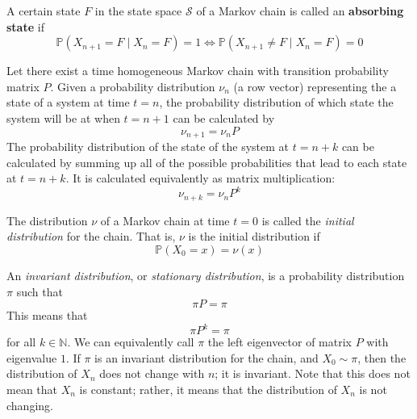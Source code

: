   \begin{definition}
    A certain state $F$ in the state space $\mathcal{S}$ of a Markov chain is called an \textbf{absorbing state} if
    \begin{equation}
      \mathbb{P}(X_{n+1} = F \; | \; X_n = F) = 1 \iff \mathbb{P}(X_{n+1} \neq F \; | \; X_n = F) = 0
    \end{equation}
  \end{definition}

  \begin{theorem}
    Let there exist a time homogeneous Markov chain with transition probability matrix $P$. Given a probability distribution $\nu_n$ (a row vector) representing the a state of a system at time $t=n$, the probability distribution of which state the system will be at when $t=n+1$ can be calculated by 
    \begin{equation}
      \nu_{n+1} = \nu_n P
    \end{equation}
    The probability distribution of the state of the system at $t=n+k$ can be calculated by summing up all of the possible probabilities that lead to each state at $t=n+k$. It is calculated equivalently as matrix multiplication: 
    \begin{equation}
      \nu_{n+k} = \nu_n P^k
    \end{equation}
  \end{theorem}

  \begin{definition}
    The distribution $\nu$ of a Markov chain at time $t=0$ is called the \textit{initial distribution} for the chain. That is, $\nu$ is the initial distribution if 
    \begin{equation}
      \mathbb{P}(X_0 = x) = \nu(x)
    \end{equation}
  \end{definition}

  \begin{definition}
    An \textit{invariant distribution}, or \textit{stationary distribution}, is a probability distribution $\pi$ such that 
    \begin{equation}
      \pi P = \pi
    \end{equation}
    This means that 
    \begin{equation}
      \pi P^k = \pi
    \end{equation}
    for all $k \in \mathbb{N}$. We can equivalently call $\pi$ the left eigenvector of matrix $P$ with eigenvalue $1$. If $\pi$ is an invariant distribution for the chain, and $X_0 \sim \pi$, then the distribution of $X_n$ does not change with $n$; it is invariant. Note that this does not mean that $X_n$ is constant; rather, it means that the distribution of $X_n$ is not changing. 
  \end{definition}

